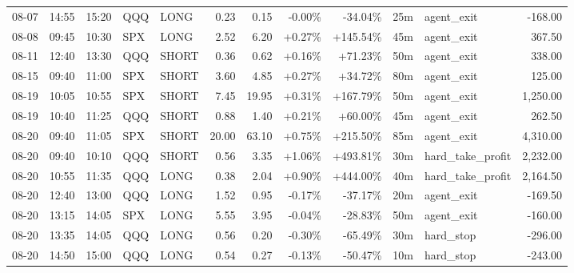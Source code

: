 \documentclass[11pt,a4paper,twoside]{article}
\begin{document}
\begin{center}
\begin{longtable}{>{\color{txtmain}}l l l l l r r r r r >{\color{txtmain}}l r}
08-07 & 14:55 & 15:20 & QQQ & LONG & 0.23 & 0.15 & \textcolor{lossred}{-0.00\%} & \textcolor{lossred}{-34.04\%} & 25m & agent\_exit & \textcolor{lossred}{-168.00} \\
08-08 & 09:45 & 10:30 & SPX & LONG & 2.52 & 6.20 & \textcolor{wingreen}{+0.27\%} & \textcolor{wingreen}{+145.54\%} & 45m & agent\_exit & \textcolor{wingreen}{367.50} \\
08-11 & 12:40 & 13:30 & QQQ & SHORT & 0.36 & 0.62 & \textcolor{wingreen}{+0.16\%} & \textcolor{wingreen}{+71.23\%} & 50m & agent\_exit & \textcolor{wingreen}{338.00} \\
08-15 & 09:40 & 11:00 & SPX & SHORT & 3.60 & 4.85 & \textcolor{wingreen}{+0.27\%} & \textcolor{wingreen}{+34.72\%} & 80m & agent\_exit & \textcolor{wingreen}{125.00} \\
08-19 & 10:05 & 10:55 & SPX & SHORT & 7.45 & 19.95 & \textcolor{wingreen}{+0.31\%} & \textcolor{wingreen}{+167.79\%} & 50m & agent\_exit & \textcolor{wingreen}{1,250.00} \\
08-19 & 10:40 & 11:25 & QQQ & SHORT & 0.88 & 1.40 & \textcolor{wingreen}{+0.21\%} & \textcolor{wingreen}{+60.00\%} & 45m & agent\_exit & \textcolor{wingreen}{262.50} \\
08-20 & 09:40 & 11:05 & SPX & SHORT & 20.00 & 63.10 & \textcolor{wingreen}{+0.75\%} & \textcolor{wingreen}{+215.50\%} & 85m & agent\_exit & \textcolor{wingreen}{4,310.00} \\
08-20 & 09:40 & 10:10 & QQQ & SHORT & 0.56 & 3.35 & \textcolor{wingreen}{+1.06\%} & \textcolor{wingreen}{+493.81\%} & 30m & hard\_take\_profit & \textcolor{wingreen}{2,232.00} \\
08-20 & 10:55 & 11:35 & QQQ & LONG & 0.38 & 2.04 & \textcolor{wingreen}{+0.90\%} & \textcolor{wingreen}{+444.00\%} & 40m & hard\_take\_profit & \textcolor{wingreen}{2,164.50} \\
08-20 & 12:40 & 13:00 & QQQ & LONG & 1.52 & 0.95 & \textcolor{lossred}{-0.17\%} & \textcolor{lossred}{-37.17\%} & 20m & agent\_exit & \textcolor{lossred}{-169.50} \\
08-20 & 13:15 & 14:05 & SPX & LONG & 5.55 & 3.95 & \textcolor{lossred}{-0.04\%} & \textcolor{lossred}{-28.83\%} & 50m & agent\_exit & \textcolor{lossred}{-160.00} \\
08-20 & 13:35 & 14:05 & QQQ & LONG & 0.56 & 0.20 & \textcolor{lossred}{-0.30\%} & \textcolor{lossred}{-65.49\%} & 30m & hard\_stop & \textcolor{lossred}{-296.00} \\
08-20 & 14:50 & 15:00 & QQQ & LONG & 0.54 & 0.27 & \textcolor{lossred}{-0.13\%} & \textcolor{lossred}{-50.47\%} & 10m & hard\_stop & \textcolor{lossred}{-243.00} \\

\end{longtable}
\end{center}
\end{document}
